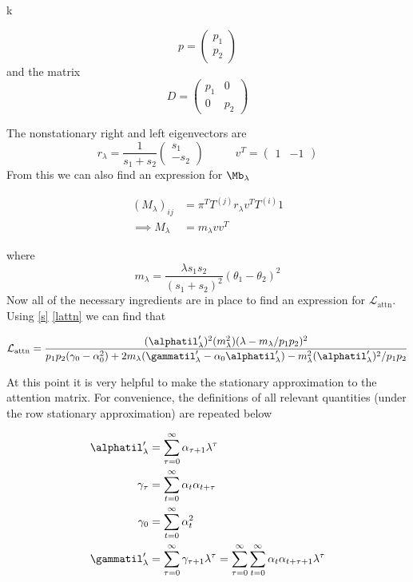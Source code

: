 k\documentclass{article}
\begin{document}
$$
p = 
\begin{pmatrix}
	p_1 \\p_2
\end{pmatrix}
$$
and the matrix 
$$
D = 
\begin{pmatrix}
	p_1 & 0 \\
	0 &p_2
\end{pmatrix}
$$

The nonstationary right and left eigenvectors are 
$$
r_\lambda = \frac{1}{s_1+s_2}\begin{pmatrix}
	s_1 \\ -s_2 
\end{pmatrix} \;\;\;\;\;\;\;\;\;\;
v^T = 
\begin{pmatrix}
	1 & -1 
\end{pmatrix}
$$
From this we can also find an expression for $\Mb_\lambda$

\begin{align}
(M_\lambda)_{ij} &= \pi^T T^{(j)} r_\lambda v^T T^{(i)}1 \\
\implies M_\lambda &= m_\lambda vv^T
\end{align}

where 
\begin{equation}\label{mlambda}
m_\lambda = \frac{\lambda s_1 s_2}{(s_1 + s_2)^2}(\theta_1 - \theta_2)^2
\end{equation}
Now all of the necessary ingredients are in place to find an expression for $\mathcal{L}_{\text{attn}}$. Using \eqref{s} \eqref{lattn} we can find that 

\begin{equation}\label{lattn_stat}
    \mathcal{L}_{\text{attn}} = \frac{(\alphatil'_\lambda)^2(m_\lambda^2)(\lambda - m_\lambda/p_1p_2)^2}{p_1p_2(\gamma_0 - \alpha_0^2) + 2m_\lambda(\gammatil'_\lambda - \alpha_0\alphatil'_\lambda) - m_\lambda^2 (\alphatil'_\lambda)^2/p_1p_2}
\end{equation}

At this point it is very helpful to make the stationary approximation to the attention matrix. For convenience, the definitions of all relevant quantities (under the row stationary approximation) are repeated below

\begin{align}
    \alphatil'_\lambda &= \sum_{\tau=0}^\infty \alpha_{\tau+1}\lambda^\tau \\
    \gamma_\tau &= \sum_{t=0}^\infty \alpha_t \alpha_{t+\tau} \\
    \gamma_0 &= \sum_{t=0}^\infty\alpha_t^2\\
    \gammatil'_\lambda &= \sum_{\tau=0}^\infty\gamma_{\tau+1}\lambda^\tau = \sum_{\tau=0}^\infty\sum_{t=0}^\infty \alpha_t \alpha_{t+\tau+1}\lambda^\tau
\end{align}
\end{document}
